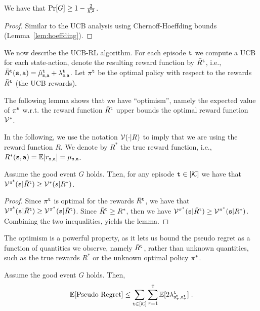 \begin{lemma}
    We have that  $\Pr[G]\geq 1-\frac{2}{\mathcal K^2}$.
\end{lemma}

\begin{proof}
    Similar to the UCB analysis using Chernoff-Hoeffding bounds (Lemma~\ref{lem:hoeffding}).
\end{proof}

We now describe the UCB-RL algorithm. For each episode ${\tt t}$ we compute a UCB for each state-action, denote the resulting reward function by $\bar{R}^{\tt t}$, i.e., $\bar{R}^{\tt t}({\tt s},{\tt a})=\hat{\mu}_{{\tt s},{\tt a}}^{\tt t}+\lambda_{{\tt s},{\tt a}}^{\tt t}$.  Let $\pi^{\tt t}$ be the optimal policy with respect to the rewards $\bar{R}^{\tt t}$ (the UCB rewards).

The following lemma shows that we have ``optimism'', namely the expected value of $\pi^{\tt t}$ w.r.t. the reward function $\bar{R}^{\tt t}$ upper bounds the optimal reward function $\mathcal{V}^*$.

In the following, we use the notation $\mathcal{V}(\cdot|R)$ to imply that we are using the reward function $R$. We denote by $R^*$ the true reward function, i.e., $R^*({\tt s},{\tt a})=\mathbb{E}[r_{{\tt s},{\tt a}}]=\mu_{{\tt s},{\tt a}}$.

\begin{lemma}
\label{MAB:lemma:UCB-RL:rewards}
    Assume the good event $G$ holds. Then, for any episode ${\tt t}\in[\mathcal K]$ we have that $\mathcal{V}^{\pi^{\tt t}}({\tt s} | \bar{R}^{\tt t})\geq \mathcal{V}^*(s|R^*)$.
\end{lemma}

\begin{proof}
    Since $\pi^{\tt t}$ is optimal for the rewards $\bar{R}^{\tt t}$, we have that $\mathcal{V}^{\pi^{\tt t}}({\tt s} | \bar{R}^{\tt t})\geq \mathcal{V}^{\pi^*}({\tt s} | \bar{R}^{\tt t})$.
Since $\bar{R}^{\tt t}\geq R^*$, then we have
$\mathcal{V}^{\pi^*}({\tt s} | \bar{R}^{\tt t})\geq \mathcal{V}^{\pi^*}({\tt s} | R^*)$.
Combining the two inequalities, yields the lemma.
\end{proof}

The optimism is a powerful property, as it lets us bound the pseudo regret as a function of quantities we observe, namely $\bar{R}^{\tt t}$, rather than unknown quantities, such as the true rewards $R^*$ or the unknown optimal policy $\pi^*$.

\begin{lemma}
\label{MAB:lemma:UCB-RL:optimism}
Assume the good event $G$ holds. Then,
    \[
    \mathbb{E}[\text{Pseudo Regret}] \leq \sum_{{\tt t}\in [\mathcal K]} \sum_{\tau=1}^{\tt T}
    \mathbb{E}[2\lambda^{\tt t}_{{\tt s}^{\tt t}_\tau,{\tt a}^{\tt t}_\tau}]\;.
    \]
\end{lemma}

